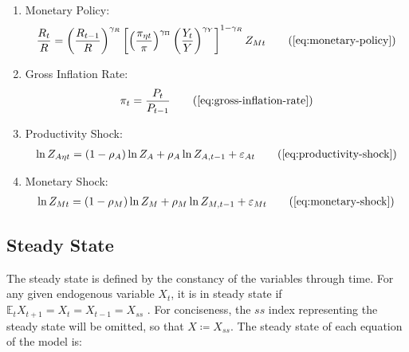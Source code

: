 \documentclass[
	12pt,
	]{article}
\numberwithin{equation}{section}
\theoremstyle{definition}
\theoremstyle{plain}
\theoremstyle{plain}
\theoremstyle{plain}
\begin{document}
{\begin{itemize}
\begin{enumerate}
			\item Monetary Policy:
			\begin{align}
				\frac{R_t}{R} = \left( 
				\frac{R_{t-1}}{R} \right)^{\gamma_R} \left[ \left(
				\frac{\pi_{\eta t}}{\pi} \right)^{\gamma_\Pi} \left( 
				\frac{Y_t}{Y} \right)^{\gamma_Y} \right]^{1-\gamma_R} Z_{Mt}
				\tag{\ref{eq:monetary-policy}}
			\end{align}
			
			\item Gross Inflation Rate:
			\begin{align}
				\pi_t = \frac{P_t}{P_{t-1}}
				\tag{\ref{eq:gross-inflation-rate}}
			\end{align}
			
			\item Productivity Shock:
			\begin{align}
				\ln{Z_{A\eta t}} = (1-\rho_A)\ln{Z_A} + \rho_A\ln{Z_{A,t-1}} + \varepsilon_{At}
				\tag{\ref{eq:productivity-shock}}
			\end{align}
			
			\item Monetary Shock:
			\begin{align}
				\ln{Z_{Mt}} = (1-\rho_M)\ln{Z_{M}} + \rho_M\ln{Z_{M,t-1}} + \varepsilon_{Mt}
				\tag{\ref{eq:monetary-shock}}
			\end{align}
			
		\end{enumerate}
		
	\end{itemize}
	
} %



\subsection{Steady State}

The steady state is defined by the constancy of the variables through time. For any given endogenous variable $X_t$, it is in steady state if $\mathbb{E}_t X_{t+1} = X_t = X_{t-1} = X_{ss}$ \cite[p.41]{costa_junior_understanding_2016}. For conciseness, the $ss$ index representing the steady state will be omitted, so that $X \coloneq X_{ss}$. The steady state of each equation of the model is:
\end{document}
